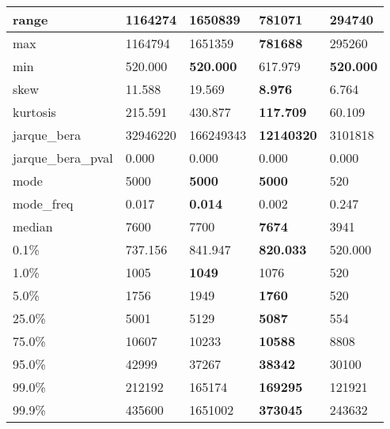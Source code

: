 \begin{table}[H]
\begin{tabular}{|l|m{10em}|m{10em}|m{10em}|m{10em}|}
\hline range & 1164274 & 1650839 & \bfseries 781071 & \cellcolor[rgb]{0.9, 0.54, 0.52} 294740 \\
\hline max & 1164794 & 1651359 & \bfseries 781688 & \cellcolor[rgb]{0.9, 0.54, 0.52} 295260 \\
\hline min & 520.000 & \bfseries 520.000 & \cellcolor[rgb]{0.9, 0.54, 0.52} 617.979 & \bfseries 520.000 \\
\hline skew & 11.588 & \cellcolor[rgb]{0.9, 0.54, 0.52} 19.569 & \bfseries 8.976 & 6.764 \\
\hline kurtosis & 215.591 & \cellcolor[rgb]{0.9, 0.54, 0.52} 430.877 & \bfseries 117.709 & 60.109 \\
\hline jarque\_bera & 32946220 & \cellcolor[rgb]{0.9, 0.54, 0.52} 166249343 & \bfseries 12140320 & 3101818 \\
\hline jarque\_bera\_pval & 0.000 & 0.000 & 0.000 & 0.000 \\
\hline mode & 5000 & \bfseries 5000 & \bfseries 5000 & \cellcolor[rgb]{0.9, 0.54, 0.52} 520 \\
\hline mode\_freq & 0.017 & \bfseries 0.014 & 0.002 & \cellcolor[rgb]{0.9, 0.54, 0.52} 0.247 \\
\hline median & 7600 & 7700 & \bfseries 7674 & \cellcolor[rgb]{0.9, 0.54, 0.52} 3941 \\
\hline 0.1\% & 737.156 & 841.947 & \bfseries 820.033 & \cellcolor[rgb]{0.9, 0.54, 0.52} 520.000 \\
\hline 1.0\% & 1005 & \bfseries 1049 & 1076 & \cellcolor[rgb]{0.9, 0.54, 0.52} 520 \\
\hline 5.0\% & 1756 & 1949 & \bfseries 1760 & \cellcolor[rgb]{0.9, 0.54, 0.52} 520 \\
\hline 25.0\% & 5001 & 5129 & \bfseries 5087 & \cellcolor[rgb]{0.9, 0.54, 0.52} 554 \\
\hline 75.0\% & 10607 & 10233 & \bfseries 10588 & \cellcolor[rgb]{0.9, 0.54, 0.52} 8808 \\
\hline 95.0\% & 42999 & 37267 & \bfseries 38342 & \cellcolor[rgb]{0.9, 0.54, 0.52} 30100 \\
\hline 99.0\% & 212192 & 165174 & \bfseries 169295 & \cellcolor[rgb]{0.9, 0.54, 0.52} 121921 \\
\hline 99.9\% & 435600 & \cellcolor[rgb]{0.9, 0.54, 0.52} 1651002 & \bfseries 373045 & 243632 \\
\hline
\end{tabular}
\end{table}
